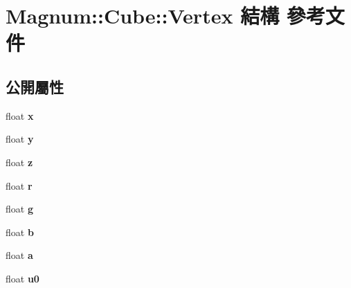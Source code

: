 \hypertarget{struct_magnum_1_1_cube_1_1_vertex}{}\section{Magnum\+:\+:Cube\+:\+:Vertex 結構 參考文件}
\label{struct_magnum_1_1_cube_1_1_vertex}
\subsection*{公開屬性}
\begin{DoxyCompactItemize}
\item 
float {\bfseries x}\hypertarget{struct_magnum_1_1_cube_1_1_vertex_a6ae65756a809502e6fa8b66bc19f0d64}{}\label{struct_magnum_1_1_cube_1_1_vertex_a6ae65756a809502e6fa8b66bc19f0d64}

\item 
float {\bfseries y}\hypertarget{struct_magnum_1_1_cube_1_1_vertex_ae40b7a873179885b8d9903d6fc1c69ed}{}\label{struct_magnum_1_1_cube_1_1_vertex_ae40b7a873179885b8d9903d6fc1c69ed}

\item 
float {\bfseries z}\hypertarget{struct_magnum_1_1_cube_1_1_vertex_a359d20e9e1f385ff42b1fd6c22d5671d}{}\label{struct_magnum_1_1_cube_1_1_vertex_a359d20e9e1f385ff42b1fd6c22d5671d}

\item 
float {\bfseries r}\hypertarget{struct_magnum_1_1_cube_1_1_vertex_aba207ba11107d7a30422a04501923b4b}{}\label{struct_magnum_1_1_cube_1_1_vertex_aba207ba11107d7a30422a04501923b4b}

\item 
float {\bfseries g}\hypertarget{struct_magnum_1_1_cube_1_1_vertex_a82a339cc9fcdac62932e3df4d95d13c2}{}\label{struct_magnum_1_1_cube_1_1_vertex_a82a339cc9fcdac62932e3df4d95d13c2}

\item 
float {\bfseries b}\hypertarget{struct_magnum_1_1_cube_1_1_vertex_a917c56a5398c2740afe1c53e4559b35e}{}\label{struct_magnum_1_1_cube_1_1_vertex_a917c56a5398c2740afe1c53e4559b35e}

\item 
float {\bfseries a}\hypertarget{struct_magnum_1_1_cube_1_1_vertex_ac9ac840f03b0fbc3c65b2d55fdd3f5f9}{}\label{struct_magnum_1_1_cube_1_1_vertex_ac9ac840f03b0fbc3c65b2d55fdd3f5f9}

\item 
float {\bfseries u0}\hypertarget{struct_magnum_1_1_cube_1_1_vertex_a44b54644105e96197240f8e1348a2604}{}\label{struct_magnum_1_1_cube_1_1_vertex_a44b54644105e96197240f8e1348a2604}


\end{DoxyCompactItemize}
